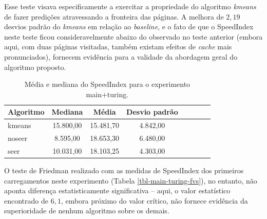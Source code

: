 \documentclass[10pt,twocolumn,letterpaper]{article}
\begin{document}
Esse teste visava especificamente a exercitar a propriedade do algoritmo \emph{kmeans} de fazer predições atravessando a fronteira das páginas. A melhora de $2,19$ desvios padrão do \emph{kmeans} em relação ao \emph{baseline}, e o fato de que o SpeedIndex neste teste ficou consideravelmente abaixo do observado no teste anterior (embora aqui, com duas páginas visitadas, também existam efeitos de \emph{cache} mais pronunciados), fornecem evidência para a validade da abordagem geral do algoritmo proposto.

\begin{table}
\begin{center}
\begin{tabular}{l*{6}{c}r}
\hline
Algoritmo & Mediana & Média & Desvio padrão \\
\hline
kmeans & 15.800,00 & 15.481,70 & 4.842,00 \\
noseer & 8.595,00 & 18.653,30 & 6.480,00 \\
seer & 10.031,00 & 18.103,25 & 4.303,00 \\
\hline
\end{tabular}
\end{center}
\caption{Média e mediana do SpeedIndex para o experimento main+turing.}
\label{tbl-main-turing}
\end{table}

O teste de Friedman realizado com as medidas de SpeedIndex dos primeiros carregamentos neste experimento (Tabela \ref{tbl-main-turing-fvs}), no entanto, não aponta diferença estatisticamente significativa -- aqui, o valor estatístico encontrado de $6,1$, embora próximo do valor crítico, não fornece evidência da superioridade de nenhum algoritmo sobre os demais.
\end{document}
